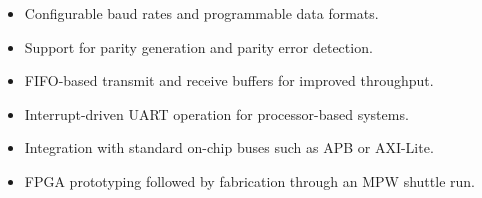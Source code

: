 \begin{itemize}
    \item Configurable baud rates and programmable data formats.
    \item Support for parity generation and parity error detection.
    \item FIFO-based transmit and receive buffers for improved throughput.
    \item Interrupt-driven UART operation for processor-based systems.
    \item Integration with standard on-chip buses such as APB or AXI-Lite.
    \item FPGA prototyping followed by fabrication through an MPW shuttle run.
\end{itemize}